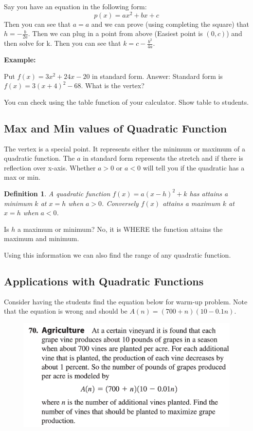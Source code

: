 \documentclass{tufte-handout}
\newtheorem{mydef}{Definition}
\begin{document}
Say you have an equation in the following form:
\[
p(x) = ax^2 + bx +c
\]
Then you can see that $a=a$ and we can prove (using completing the square) that $h = -\frac{b}{2a}$.  Then we can plug in a point from above (Easiest point is $(0,c)$) and then solve for k.  Then you can see that $k = c-\frac{b^2}{4a}$.

\noindent \textbf{Example:}

Put $f(x) = 3x^2 + 24 x - 20$ in standard form.  Answer: Standard form is $f(x) = 3(x + 4)^2  - 68$. What is the vertex?

You can check using the table function of your calculator. Show table to students.

\subsection{Max and Min values of Quadratic Function}

The vertex is a special point.  It represents either the minimum or maximum of a quadratic function.  The $a$ in standard form represents the stretch and if there is reflection over x-axis.  Whether $a>0$ or $a<0$ will tell you if the quadratic has a max or min.

\begin{mydef}
A quadratic function $f(x) = a (x-h)^2 + k$ has attains a minimum $k$ at $x = h$ when $a>0$. Conversely $f(x)$ attains a maximum $k$ at $x=h$ when $a<0$.
\end{mydef}

Is $h$ a maximum or minimum? No, it is WHERE the function attains the maximum and minimum.

Using this information we can also find the range of any quadratic function.

\subsection{Applications with Quadratic Functions}

Consider having the students find the equation below for warm-up problem. Note that the equation is wrong and should be $A(n) = (700+n)(10-0.1n)$.

\begin{figure}
\centering
\includegraphics[width = \linewidth]{3-1QuadApp.png}
\end{figure}
\end{document}
